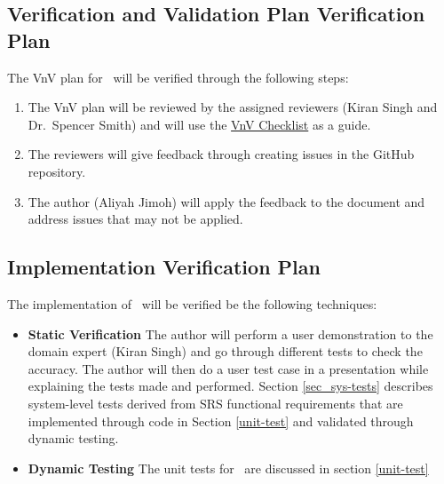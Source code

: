 \documentclass[12pt, titlepage]{article}
\begin{document}



\subsection{Verification and Validation Plan Verification Plan}\label{plan_verification}

The VnV plan for \progname~will be verified through the following steps:
\begin{enumerate}
  \item The VnV plan will be reviewed by the assigned reviewers (Kiran Singh and Dr.~Spencer Smith) and will use the \href{https://github.com/AliyahJimoh/2D-Localizer/blob/main/docs/Checklists/VnV-Checklist.pdf}{VnV Checklist} as a guide.
  \item The reviewers will give feedback through creating issues in the GitHub repository.
  \item The author (Aliyah Jimoh) will apply the feedback to the document and address issues that may not be applied.
\end{enumerate}




\subsection{Implementation Verification Plan}\label{plan_implement}

The implementation of \progname~will be verified be the following techniques:
\begin{itemize}
  \item \textbf{Static Verification}
  \newline  
    The author will perform a user demonstration to the domain expert (Kiran Singh) and go through different tests to check the accuracy. The author will then do a user test case in a presentation while explaining the tests made and performed. Section \ref{sec_sys-tests} describes system-level tests derived from SRS functional requirements that are implemented through code in Section \ref{unit-test} and validated through dynamic testing.

  \item \textbf{Dynamic Testing}
  \newline
  The unit tests for \progname~are discussed in section \ref{unit-test} 

\end{itemize}
\end{document}
